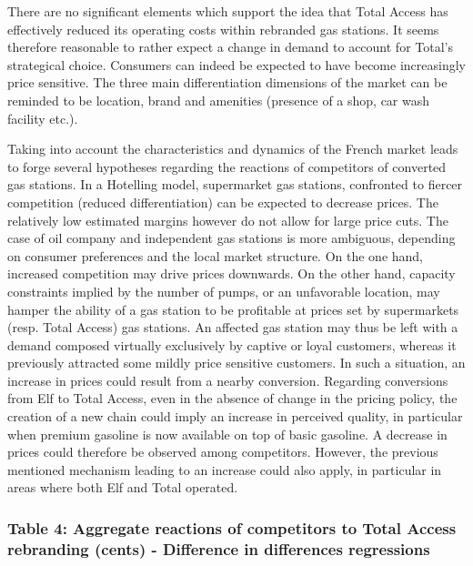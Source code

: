 \documentclass[english]{article}
\begin{document}
There are no significant elements which support the idea that Total Access has effectively reduced its operating costs within rebranded gas stations. It seems therefore reasonable to rather expect a change in demand to account for Total’s strategical choice. Consumers can indeed be expected to have become increasingly price sensitive. The three main differentiation dimensions of the market can be reminded to be location, brand and amenities (presence of a shop, car wash facility etc.).\medskip{}

Taking into account the characteristics and dynamics of the French market leads to forge several hypotheses regarding the reactions of competitors of converted gas stations. In a Hotelling model, supermarket gas stations, confronted to fiercer competition (reduced differentiation) can be expected to decrease prices. The relatively low estimated margins however do not allow for large price cuts. The case of oil company and independent gas stations is more ambiguous, depending on consumer preferences and the local market structure. On the one hand, increased competition may drive prices downwards. On the other hand, capacity constraints implied by the number of pumps, or an unfavorable location, may hamper the ability of a gas station to be profitable at prices set by supermarkets (resp. Total Access) gas stations. An affected gas station may thus be left with a demand composed virtually exclusively by captive or loyal customers, whereas it previously attracted some mildly price sensitive customers. In such a situation, an increase in prices could result from a nearby conversion. Regarding conversions from Elf to Total Access, even in the absence of change in the pricing policy, the creation of a new chain could imply an increase in perceived quality, in particular when premium gasoline is now available on top of basic gasoline. A decrease in prices could therefore be observed among competitors. However, the previous mentioned mechanism leading to an increase could also apply, in particular in areas where both Elf and Total operated. \medskip{}

\newpage{}

\subsubsection*{Table 4: Aggregate reactions of competitors to Total Access rebranding (cents) - Difference in differences regressions}
\end{document}
